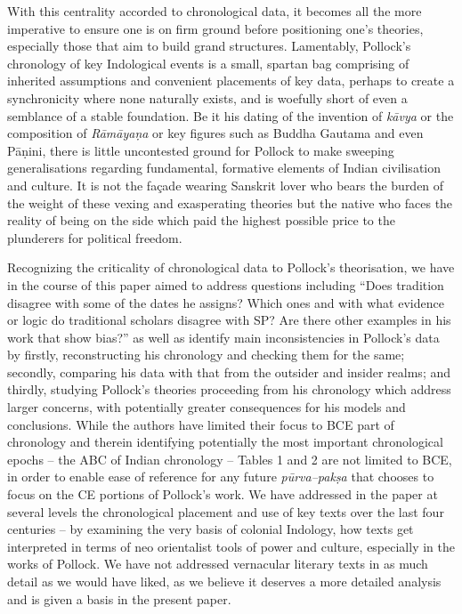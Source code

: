 With this centrality accorded to chronological data, it becomes all the more imperative to ensure one is on firm ground before positioning one’s theories, especially those that aim to build grand structures. Lamentably, Pollock’s chronology of key Indological events is a small, spartan bag comprising of inherited assumptions and convenient placements of key data, perhaps to create a synchronicity where none naturally exists, and is woefully short of even a semblance of a stable foundation. Be it his dating of the invention of \textit{kāvya} or the composition of \textit{Rāmāyaṇa} or key figures such as Buddha Gautama and even Pāṇini, there is little uncontested ground for Pollock to make sweeping generalisations regarding fundamental, formative elements of Indian civilisation and culture. It is not the façade wearing Sanskrit lover who bears the burden of the weight of these vexing and exasperating theories but the native who faces the reality of being on the side which paid the highest possible price to the plunderers for political freedom.

Recognizing the criticality of chronological data to Pollock’s theorisation, we have in the course of this paper aimed to address questions including “Does tradition disagree with some of the dates he assigns? Which ones and with what evidence or logic do traditional scholars disagree with SP? Are there other examples in his work that show bias?” as well as identify main inconsistencies in Pollock’s data by firstly, reconstructing his chronology and checking them for the same; secondly, comparing his data with that from the outsider and insider realms; and thirdly, studying Pollock’s theories proceeding from his chronology which address larger concerns, with potentially greater consequences for his models and conclusions. While the authors have limited their focus to BCE part of chronology and therein identifying potentially the most important chronological epochs – the ABC of Indian chronology – Tables 1 and 2 are not limited to BCE, in order to enable ease of reference for any future \textit{pūrva–pakṣa} that chooses to focus on the CE portions of Pollock’s work. We have addressed in the paper at several levels the chronological placement and use of key texts over the last four centuries – by examining the very basis of colonial Indology, how texts get interpreted in terms of neo orientalist tools of power and culture, especially in the works of Pollock. We have not addressed vernacular literary texts in as much detail as we would have liked, as we believe it deserves a more detailed analysis and is given a basis in the present paper.

